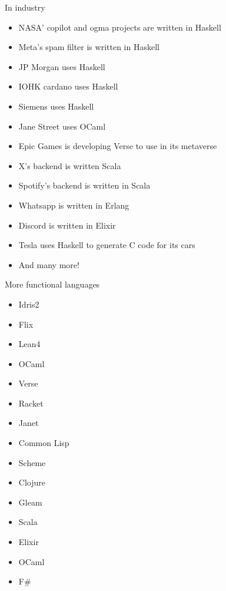 \documentclass[pdf]{beamer}
\begin{document}
\begin{frame}{In industry}
  \begin{itemize}
  \item NASA' copilot and ogma projects are written in Haskell
  \item Meta's spam filter is written in Haskell
  \item JP Morgan uses Haskell
  \item IOHK cardano uses Haskell
  \item Siemens uses Haskell
  \item Jane Street uses OCaml
  \item Epic Games is developing Verse to use in its metaverse
  \item X's backend is written Scala
  \item Spotify's backend is written in Scala
  \item Whatsapp is written in Erlang
  \item Discord is written in Elixir
  \item Tesla uses Haskell to generate C code for its cars
  \item And many more!
  \end{itemize}
\end{frame}

\begin{frame}{More functional languages}
  \begin{itemize}
  \item Idris2
  \item Flix
  \item Lean4
  \item OCaml
  \item Verse
  \item Racket
  \item Janet
  \item Common Lisp
  \item Scheme
  \item Clojure
  \item Gleam
  \item Scala
  \item Elixir
  \item OCaml
  \item F\#
  \end{itemize}
\end{frame}
\end{document}
